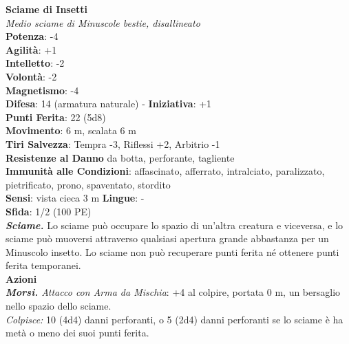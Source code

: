 \begin{multicols}{2}
\medskip\textbf{Sciame di Insetti}\\
\emph{Medio sciame di Minuscole bestie, disallineato}\\
\textbf{Potenza}: -4\\
\textbf{Agilità}: +1\\
\textbf{Intelletto}: -2\\
\textbf{Volontà}: -2\\
\textbf{Magnetismo}: -4\\
\textbf{Difesa}: 14 (armatura naturale) - \textbf{Iniziativa}: +1\\
\textbf{Punti Ferita}: 22 (5d8)\\
\textbf{Movimento}: 6 m, scalata 6 m\\
\textbf{Tiri Salvezza}: Tempra -3, Riflessi +2, Arbitrio -1\\
\textbf{Resistenze al Danno} da botta, perforante, tagliente\\
\textbf{Immunità alle Condizioni}: affascinato, afferrato, intralciato, paralizzato, pietrificato, prono, spaventato, stordito\\
\textbf{Sensi}: vista cieca 3 m
\textbf{Lingue}: -\\
\textbf{Sfida}: 1/2 (100 PE)\smallskip\\
\emph{\textbf{Sciame.}} Lo sciame può occupare lo spazio di un'altra creatura e viceversa, e lo sciame può muoversi attraverso qualsiasi apertura grande abbastanza per un Minuscolo insetto. Lo sciame non può recuperare punti ferita né ottenere punti ferita temporanei.\\
\smallskip\textbf{Azioni}\\
\emph{\textbf{Morsi.} Attacco con Arma da Mischia}: +4 al colpire, portata 0 m, un bersaglio nello spazio dello sciame.\\
\emph{Colpisce:} 10 (4d4) danni perforanti, o 5 (2d4) danni perforanti se lo sciame è ha metà o meno dei suoi punti ferita.\\


\end{multicols}

